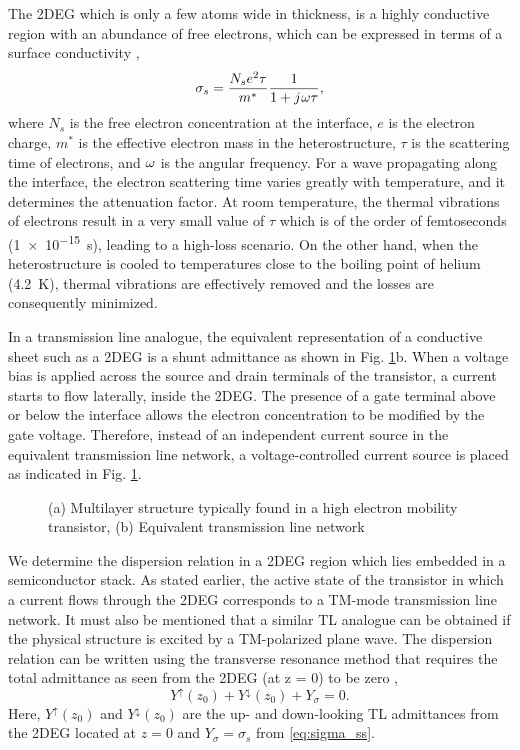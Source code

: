 The 2DEG which is only a few atoms wide in thickness, is a highly conductive region with an abundance of free electrons, which can be expressed in terms of a surface conductivity \cite{Burke2000},
%
\begin{equation}
  \sigma_s = \frac{N_s e^2 \tau}{m^{\ast}}\frac{1}{1 + {j}\mkern1mu \omega \tau},
  \label{eq:sigma_ss}
\end{equation}
%
where $N_s$ is the free electron concentration at the interface, $e$ is the electron charge, $m^{\ast}$ is the effective electron mass in the heterostructure, $\tau$ is the scattering time of electrons, and $\omega$ is the angular frequency. For a wave propagating along the interface, the electron scattering time varies greatly with temperature, and it determines the attenuation factor. At room temperature, the thermal vibrations of electrons result in a very small value of $\tau$ which is of the order of femtoseconds (\SI{1e-15}{\s}), leading to a high-loss scenario. On the other hand, when the heterostructure is cooled to temperatures close to the boiling point of helium (\SI[round-precision=2]{4.2}{\kelvin}), thermal vibrations are effectively removed and the losses are consequently minimized.

In a transmission line analogue, the equivalent representation of a conductive sheet such as a 2DEG is a shunt admittance as shown in Fig. \ref{fig:TL_equivalent_poles}b. When a voltage bias is applied across the source and drain terminals of the transistor, a current starts to flow laterally, inside the 2DEG. The presence of a gate terminal above or below the interface allows the electron concentration to be modified by the gate voltage. Therefore, instead of an independent current source in the equivalent transmission line network, a voltage-controlled current source is placed as indicated in Fig. \ref{fig:TL_equivalent_poles}.
%
\begin{figure}[t!]
  \centering
  \def\svgwidth{\linewidth}
  
  \caption{(a) Multilayer structure typically found in a high electron mobility transistor, (b) Equivalent transmission line network}
  \label{fig:TL_equivalent_poles}
\end{figure}
%

We determine the dispersion relation in a 2DEG region which lies embedded in a semiconductor stack. As stated earlier, the active state of the transistor in which a current flows through the 2DEG corresponds to a TM-mode transmission line network. It must also be mentioned that a similar TL analogue can be obtained if the physical structure is excited by a TM-polarized plane wave. The dispersion relation can be written using the transverse resonance method that requires the total admittance as seen from the 2DEG (at z = 0) to be zero \cite{Felsen1994,Gomez-Diaz2012},
%
\begin{equation}
  Y^{\uparrow}(z_0) + Y^{\downarrow}(z_0) + Y_{\sigma} = 0.
  \label{eq:dispersion}
\end{equation}
%
Here, $Y^{\uparrow}(z_0)$ and $Y^{\downarrow}(z_0)$ are the up- and down-looking TL admittances from the 2DEG located at $z = 0$ and $Y_{\sigma} = \sigma_s$ from \eqref{eq:sigma_ss}.

